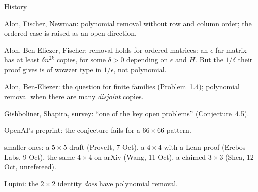 \documentclass[aspectratio=169,11pt,t]{beamer}
\begin{document}
\begin{frame}{History}
\small
{}
\begin{description}[Nov 2026]\setlength{\itemsep}{0.22em}
\item[2007] Alon, Fischer, Newman: polynomial removal without row and column order; the ordered case is raised as an open direction.
\item[2017] Alon, Ben-Eliezer, Fischer: removal holds for ordered matrices: an $\epsilon$-far matrix has at least $\delta n^{2k}$ copies, for some $\delta>0$ depending on $\epsilon$ and $H$. But the $1/\delta$ their proof gives is of wowzer type in $1/\epsilon$, not polynomial.
\item[2020] Alon, Ben-Eliezer: the question for finite families (Problem~1.4); polynomial removal when there are many \emph{disjoint} copies.
\item[2025] Gishboliner, Shapira, survey: ``one of the key open problems'' (Conjecture~4.5).
\item[Sep 2026] OpenAI's preprint: the conjecture \alert{fails} for a $66\times66$ pattern.
\item[Oct 2026] smaller ones: a $5\times5$ draft (ProveIt, 7 Oct), a $4\times4$ with a Lean proof (Erebos Labs, 9 Oct), the same $4\times4$ on arXiv (Wang, 11 Oct), a claimed $3\times3$ (Shea, 12 Oct, unrefereed).
\item[Nov 2026] Lupini: the $2\times2$ identity \emph{does} have polynomial removal.
\end{description}
\end{frame}
\end{document}

